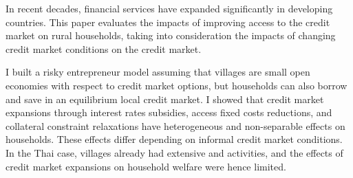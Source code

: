 
In recent decades, \NLC financial services have expanded significantly in developing countries. This paper evaluates the impacts of improving access to the \NLC credit market on rural households, taking into consideration the impacts of changing \NLC credit market conditions on the \LLC credit market.

I built a risky entrepreneur model assuming that villages are small open economies with respect to \NLC credit market options, but households can also borrow and save in an equilibrium local credit market. I showed that \NLC credit market expansions through interest rates subsidies, access fixed costs reductions, and collateral constraint relaxations have heterogeneous and non-separable effects on households. These effects differ depending on informal credit market conditions. In the Thai case, villages already had extensive \LLC \BBBB and \SSSS activities, and the effects of \NLC credit market expansions on household welfare were hence limited.
